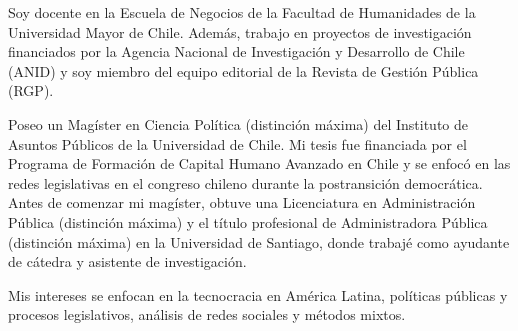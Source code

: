 




\par{Soy docente en la Escuela de Negocios de la Facultad de Humanidades de la Universidad Mayor de Chile. Además, trabajo en proyectos de investigación financiados por la Agencia Nacional de Investigación y Desarrollo de Chile (ANID) y soy miembro del equipo editorial de la Revista de Gestión Pública (RGP).

Poseo un Magíster en Ciencia Política (distinción máxima) del Instituto de Asuntos Públicos de la Universidad de Chile. Mi tesis fue financiada por el Programa de Formación de Capital Humano Avanzado en Chile y se enfocó en las redes legislativas en el congreso chileno durante la postransición democrática. Antes de comenzar mi magíster, obtuve una Licenciatura en Administración Pública (distinción máxima) y el título profesional de Administradora Pública (distinción máxima) en la Universidad de Santiago, donde trabajé como ayudante de cátedra y asistente de investigación.

Mis intereses se enfocan en la tecnocracia en América Latina, políticas públicas y procesos legislativos, análisis de redes sociales y métodos mixtos.}\\
